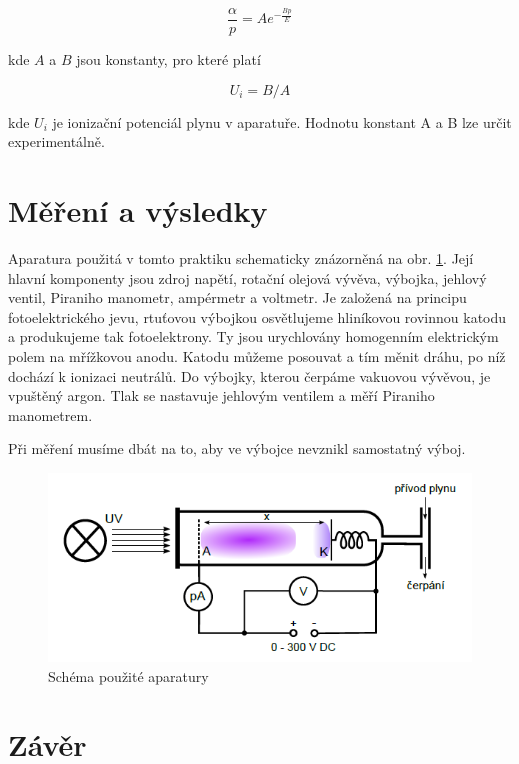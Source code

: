 \documentclass[a4paper,12pt]{article}
\begin{document}
\begin{equation}
	\frac{\alpha}{p} = A e^{-\frac{Bp}{E}} 
\end{equation}

kde $A$ a $B$ jsou konstanty, pro které platí

\begin{equation}
	U_i = B/A
\end{equation}

kde $U_i$ je ionizační potenciál plynu v aparatuře. Hodnotu konstant A a B lze určit experimentálně.

\section{Měření a výsledky}

Aparatura použitá v tomto praktiku schematicky znázorněná na obr. \ref{aparatura}. Její hlavní komponenty jsou zdroj napětí, rotační olejová vývěva, výbojka, jehlový ventil, Piraniho manometr, ampérmetr a voltmetr. Je založená na principu fotoelektrického jevu, rtuťovou výbojkou osvětlujeme hliníkovou rovinnou katodu a produkujeme tak fotoelektrony. Ty jsou urychlovány homogenním elektrickým polem na mřížkovou anodu. Katodu můžeme posouvat a tím měnit dráhu, po níž dochází k ionizaci neutrálů. Do výbojky, kterou čerpáme vakuovou vývěvou, je vpuštěný argon. Tlak se nastavuje jehlovým ventilem a měří Piraniho manometrem. 

Při měření musíme dbát na to, aby ve výbojce nevznikl samostatný výboj.


\begin{figure}[h]
	\centering
	\includegraphics[width=130mm]{aparatura.png}
	\caption{Schéma použité aparatury}
	\label{aparatura}
	\end{figure}

\section{Závěr}
\end{document}
